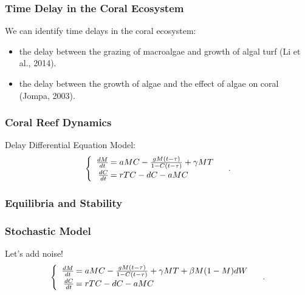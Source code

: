 \begin{frame}
\frametitle{Time Delay in the Coral Ecosystem}
We can identify time delays in the coral ecosystem:
\begin{itemize}
\item the delay between the grazing of macroalgae and growth of algal turf (Li et al., 2014).\\
\item  the delay between the growth of algae and the effect of algae on coral (Jompa, 2003).
\end{itemize}
\end{frame}

\begin{frame}\frametitle{Coral Reef Dynamics}
Delay Differential Equation Model:
$$\begin{cases}\begin{array}{rl}
\frac{dM}{dt}\hspace{-.8em}&=aMC - \frac{gM(t-\tau)}{1-C(t-\tau)}+\gamma M T\\
\frac{dC}{dt}\hspace{-.8em}&=rTC - dC - aMC\\
\end{array}\end{cases}.$$
\end{frame}

\begin{frame}
\frametitle{Equilibria and Stability}
\end{frame}

\begin{frame}
\frametitle{Stochastic Model}
Let's add noise!
$$\begin{cases}\begin{array}{rl}
\frac{dM}{dt}\hspace{-.8em}&=aMC - \frac{gM(t-\tau)}{1-C(t-\tau)}+\gamma M T+\beta M(1-M)dW\\
\frac{dC}{dt}\hspace{-.8em}&=rTC - dC - aMC\\
\end{array}\end{cases}.$$
\end{frame}
